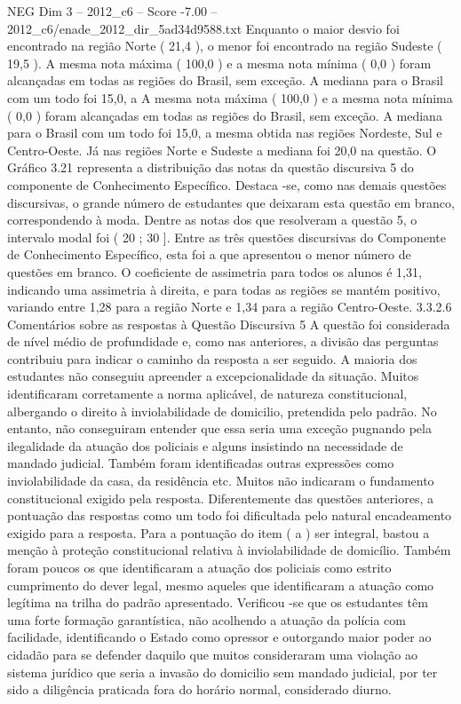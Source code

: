 \begin{textsample}{NEG Dim 3 – 2012\_c6 – Score -7.00 – 2012\_c6/enade\_2012\_dir\_5ad34d9588.txt}
Enquanto o maior desvio foi encontrado na região Norte ( 21,4 ), o menor foi encontrado na região Sudeste ( 19,5 ).
A mesma nota máxima ( 100,0 ) e a mesma nota mínima ( 0,0 ) foram alcançadas em todas as regiões do Brasil, sem exceção.
A mediana para o Brasil com um todo foi 15,0, a A mesma nota máxima ( 100,0 ) e a mesma nota mínima ( 0,0 ) foram alcançadas em todas as regiões do Brasil, sem exceção.
A mediana para o Brasil com um todo foi 15,0, a mesma obtida nas regiões Nordeste, Sul e Centro-Oeste.
Já nas regiões Norte e Sudeste a mediana foi 20,0 na questão.
O Gráfico 3.21 representa a distribuição das notas da questão discursiva 5 do componente de Conhecimento Específico.
Destaca -se, como nas demais questões discursivas, o grande número de estudantes que deixaram esta questão em branco, correspondendo à moda.
Dentre as notas dos que resolveram a questão 5, o intervalo modal foi ( 20 ; 30 ].
Entre as três questões discursivas do Componente de Conhecimento Específico, esta foi a que apresentou o menor número de questões em branco.
O coeficiente de assimetria para todos os alunos é 1,31, indicando uma assimetria à direita, e para todas as regiões se mantém positivo, variando entre 1,28 para a região Norte e 1,34 para a região Centro-Oeste. 3.3.2.6 Comentários sobre as respostas à Questão Discursiva 5 A questão foi considerada de nível médio de profundidade e, como nas anteriores, a divisão das perguntas contribuiu para indicar o caminho da resposta a ser seguido.
A maioria dos estudantes não conseguiu apreender a excepcionalidade da situação.
Muitos identificaram corretamente a norma aplicável, de natureza constitucional, albergando o direito à inviolabilidade de domicilio, pretendida pelo padrão.
No entanto, não conseguiram entender que essa seria uma exceção pugnando pela ilegalidade da atuação dos policiais e alguns insistindo na necessidade de mandado judicial.
Também foram identificadas outras expressões como inviolabilidade da casa, da residência etc.
Muitos não indicaram o fundamento constitucional exigido pela resposta.
Diferentemente das questões anteriores, a pontuação das respostas como um todo foi dificultada pelo natural encadeamento exigido para a resposta.
Para a pontuação do item ( a ) ser integral, bastou a menção à proteção constitucional relativa à inviolabilidade de domicílio.
Também foram poucos os que identificaram a atuação dos policiais como estrito cumprimento do dever legal, mesmo aqueles que identificaram a atuação como legítima na trilha do padrão apresentado.
Verificou -se que os estudantes têm uma forte formação garantística, não acolhendo a atuação da polícia com facilidade, identificando o Estado como opressor e outorgando maior poder ao cidadão para se defender daquilo que muitos consideraram uma violação ao sistema jurídico que seria a invasão do domicilio sem mandado judicial, por ter sido a diligência praticada fora do horário normal, considerado diurno.

\end{textsample}
